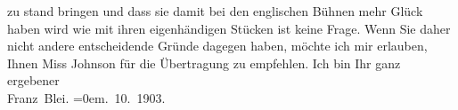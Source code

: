 \begin{ledgroupsized}[t]{13cm}
               zu stand bringen und dass sie damit bei den englischen Bühnen mehr Glück haben wird wie mit ihren eigenhändigen Stücken
               ist keine Frage. Wenn Sie {\pb}daher nicht
               andere entscheidende Gründe dagegen haben, möchte ich mir erlauben, Ihnen Miss Johnson für die Übertragung zu empfehlen.\pend
           \pstart
           Ich bin Ihr ganz ergebener{\\[\baselineskip]}\spacefill\mbox{Franz Blei.}\pend
           \leftskip=0em{}. 10. 1903.\pend
           
         
         \endnumbering{}\end{ledgroupsized}  \newcommand{\dateiname}{L01327}\newcommand{\titel}{Franz Blei an Arthur Schnitzler, 12. 10. 1903}\newcommand{\editorInnen}{Martin Anton Müller und Gerd-Hermann Susen}
      